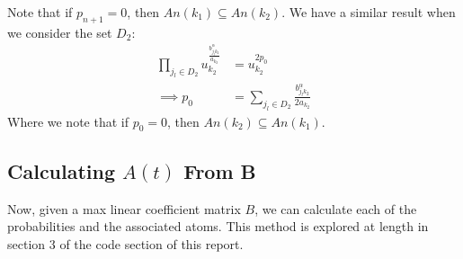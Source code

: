\documentclass[12pt]{article}
\theoremstyle{definition}
\theoremstyle{definition}
\begin{document}
Note that if $p_{n+1}=0$, then $An(k_1)\subseteq An(k_2)$. We have a similar result when we consider the set $D_2$:
\begin{align*}
    \prod_{j_l\in D_2 }u_{k_2}^{\frac{b_{j_lk_2}^\alpha}{a_{k_2}}} &=  u_{k_2}^{2p_{0}}\\
    \implies p_{0}&= \sum_{j_l \in D_2}\frac{b_{j_lk_2}^\alpha}{2a_{k_2}}
\end{align*}
Where we note that if $p_0=0$, then $An(k_2)\subseteq An(k_1)$.

\subsection{Calculating $A(t)$ From B}
Now, given a max linear coefficient matrix $B$, we can calculate each of the probabilities and the associated atoms. This method is explored at length in section 3 of the code section of this report.
\end{document}
